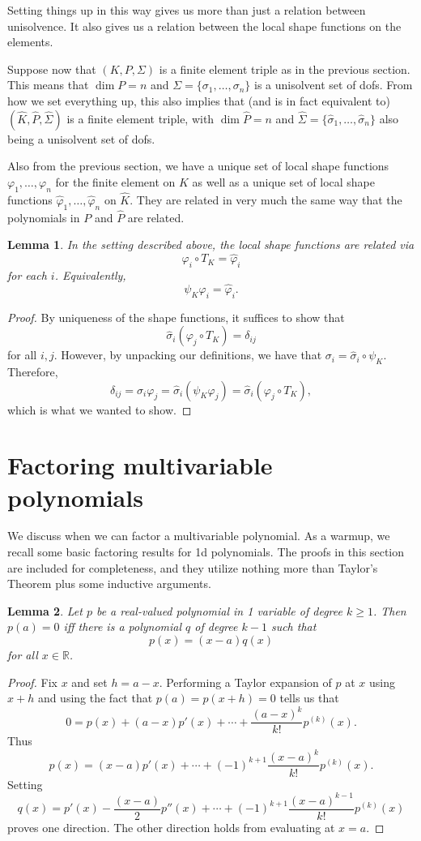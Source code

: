 \documentclass{article}
\theoremstyle{plain}
\newtheorem{lemma}{Lemma}
\theoremstyle{definition}
\theoremstyle{remark}
\begin{document}
Setting things up in this way gives us more than just a relation between unisolvence.
It also gives us a relation between the local shape functions on the elements.

Suppose now that $(K, P, \Sigma)$ is a finite element triple as in the previous section.
This means that $\dim P = n$ and $\Sigma = \{\sigma_1,\dots,\sigma_n\}$ is a unisolvent set of dofs.
From how we set everything up, this also implies that (and is in fact equivalent to) $(\widehat K, \widehat P, \widehat \Sigma)$ is a finite element triple, with $\dim \widehat P = n$ and $\widehat \Sigma = \{\widehat \sigma_1,\dots,\widehat \sigma_n\}$ also being a unisolvent set of dofs.

Also from the previous section, we have a unique set of local shape functions $\varphi_1,\dots,\varphi_n$ for the finite element on $K$ as well as a unique set of local shape functions $\widehat\varphi_1,\dots,\widehat\varphi_n$ on $\widehat K$.
They are related in very much the same way that the polynomials in $P$ and $\widehat P$ are related.
\begin{lemma}
	In the setting described above, the local shape functions are related via \[\varphi_i \circ T_K = \widehat\varphi_i\] for each $i$.
	Equivalently, \[\psi_K\varphi_i = \widehat\varphi_i.\]
\end{lemma}
\begin{proof}
	By uniqueness of the shape functions, it suffices to show that \[\widehat\sigma_i(\varphi_j\circ T_K) = \delta_{ij}\] for all $i,j$.
	However, by unpacking our definitions, we have that $\sigma_i = \widehat \sigma_i \circ \psi_K$.
	Therefore, \[\delta_{ij} = \sigma_i\varphi_j = \widehat \sigma_i(\psi_K\varphi_j) = \widehat \sigma_i(\varphi_j \circ T_K),\]
	which is what we wanted to show.
\end{proof}


\section{Factoring multivariable polynomials}\label{app:factor}
We discuss when we can factor a multivariable polynomial.
As a warmup, we recall some basic factoring results for 1d polynomials.
The proofs in this section are included for completeness, and they utilize nothing more than Taylor's Theorem plus some inductive arguments.

\begin{lemma}
	Let $p$ be a real-valued polynomial in 1 variable of degree $k \geq 1$.
	Then $p(a) = 0$ iff there is a polynomial $q$ of degree $k-1$ such that \[p(x) = (x-a)q(x)\] for all $x \in \mathbb R$.
\end{lemma}
\begin{proof}
	Fix $x$ and set $h = a-x$.
	Performing a Taylor expansion of $p$ at $x$ using $x + h$ and using the fact that $p(a) = p(x+h) = 0$ tells us that
	\[0 = p(x) + (a-x)p'(x) + \cdots + \frac{(a-x)^k}{k!}p^{(k)}(x).\]
	Thus \[p(x) = (x-a)p'(x) + \cdots + (-1)^{k+1}\frac{(x-a)^k}{k!}p^{(k)}(x).\]
	Setting
	\[q(x) = p'(x) - \frac{(x-a)}{2}p''(x) + \cdots + (-1)^{k+1}\frac{(x-a)^{k-1}}{k!}p^{(k)}(x)\]
	proves one direction.
	The other direction holds from evaluating at $x = a$.
\end{proof}
\end{document}
